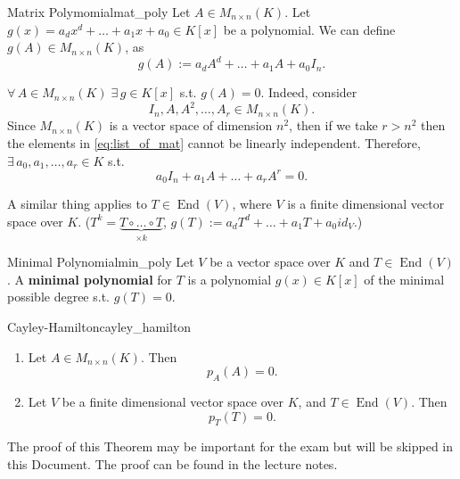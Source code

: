 \begin{definition}{Matrix Polymomial}{mat_poly}
	Let $A \in M_{n \times n}(K)$. Let $g(x) = a_dx^d + \hdots + a_1x + a_0 \in K[x]$ be a polynomial. We can define $g(A) \in M_{n \times n}(K)$, as
	\[
		g(A) := a_d A^d + \hdots + a_1 A + a_0 I_n.
	\]
\end{definition}

\begin{remark}
	$\forall \, A \in M_{n \times n}(K) \; \exists \, g \in K[x]$ s.t. $g(A) = 0$. Indeed, consider
	\begin{equation}
		\label{eq:list_of_mat}
		I_n, A, A^2, \hdots , A_r \in M_{n \times n}(K).
	\end{equation} 
	Since $M_{n \times n}(K)$ is a vector space of dimension $n^2$, then if we take $r > n^2$ then the elements in \eqref{eq:list_of_mat} cannot be linearly independent. Therefore, $\exists \, a_0, a_1, \hdots , a_r \in K$ s.t. 
	\[
		a_0I_n + a_1 A + \hdots + a_r A^r = 0.
	\]
	
	A similar thing applies to $T \in \operatorname{End}(V)$, where $V$ is a finite dimensional vector space over $K$. ($T^k = \underbrace{T \circ \hdots \circ T}_{\displaystyle \times k}$, $g(T) := a_d T^d + \hdots + a_1 T + a_0 id_V $.)
\end{remark}

\begin{definition}{Minimal Polynomial}{min_poly}
	Let $V$ be a vector space over $K$ and $T \in \operatorname{End}(V)$. A \textbf{minimal polynomial} for $T$ is a polynomial $g(x) \in K[x]$ of the minimal possible degree s.t. $g(T) = 0$.
\end{definition}

\begin{theorem}{Cayley-Hamilton}{cayley_hamilton}
	\begin{enumerate}
		\item Let $A \in M_{n \times n}(K)$. Then
		\[
			p_A(A) = 0.
		\]		
		\item Let $V$ be a finite dimensional vector space over $K$, and $T \in \operatorname{End}(V)$. Then
		\[
			p_T(T) = 0.
		\]
	\end{enumerate}
\end{theorem}

The proof of this Theorem may be important for the exam but will be skipped in this Document. The proof can be found in the lecture notes.















